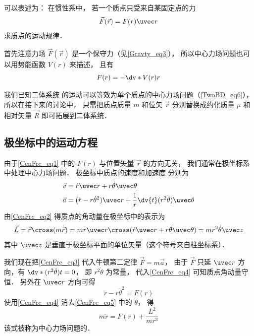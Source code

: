 

 可以表述为： 在惯性系中， 若一个质点只受来自某固定点的力
\begin{equation}\label{CenFrc_eq1}
\vec F(\vec r) = F(r) \uvec r
\end{equation}
求质点的运动规律．

首先注意力场 $\vec F(\vec r)$ 是一个保守力（见\autoref{Gravty_eq3}）， 所以中心力场问题也可以用势能函数 $V(r)$ 来描述， 且有
\begin{equation}
F(r) = -\dv*{V(r)}{r}
\end{equation}

我们已知二体系统 的运动可以等效为单个质点的中心力场问题（\autoref{TwoBD_eq6}）， 所以在接下来的讨论中， 只需把质点质量 $m$ 和位矢 $\vec r$ 分别替换成约化质量 $\mu$ 和相对矢量 $\vec R$ 即可拓展到二体系统．

\subsection{极坐标中的运动方程}
由于\autoref{CenFrc_eq1} 中的 $F(r)$ 与位置矢量 $\vec r$ 的方向无关， 我们通常在极坐标系 中处理中心力场问题． 极坐标中质点的速度和加速度 分别为
\begin{align}
\vec v &= \dot r \uvec r + r\dot\theta\uvec\theta\label{CenFrc_eq2}\\
\vec a &= (\ddot{r} - r \dot\theta^2)\uvec r + \frac 1r \dv{t} (r^2\dot\theta)\uvec \theta\label{CenFrc_eq3}
\end{align}
由\autoref{CenFrc_eq2} 得质点的角动量在极坐标中的表示为
\begin{equation}\label{CenFrc_eq4}
\vec L = \vec r \cross (m \dot{\vec r})
= mr \uvec r \cross (\dot r \uvec r + r\dot\theta \uvec\theta)
= mr^2\dot \theta \uvec z
\end{equation}
其中 $\uvec z$ 是垂直于极坐标平面的单位矢量（这个符号来自柱坐标系）． 

我们现在把\autoref{CenFrc_eq3} 代入牛顿第二定律 $\vec F = m\vec a$， 由于 $\vec F$ 只延 $\uvec r$ 方向，有 $\dv*{(r^2\dot\theta)}{t} = 0$， 即 $r^2\dot\theta$ 为常量， 代入\autoref{CenFrc_eq4} 可知质点角动量守恒． 另外在 $\uvec r$ 方向可得
\begin{equation}\label{CenFrc_eq5}
\ddot{r} - r \dot\theta^2 = F(r)
\end{equation}
使用\autoref{CenFrc_eq4} 消去\autoref{CenFrc_eq5} 中的 $\dot\theta$， 得
\begin{equation}\label{CenFrc_eq7}
m\ddot r = F(r) + \frac{L^2}{mr^3}
\end{equation}
该式被称为中心力场问题的．

